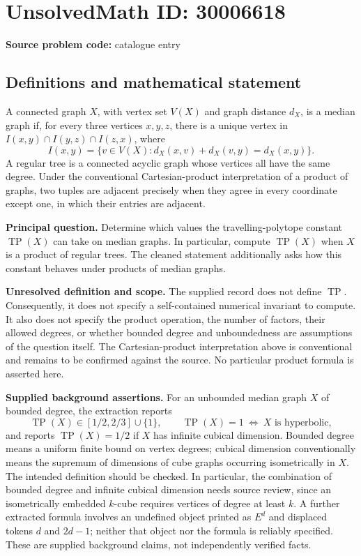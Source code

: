 \documentclass[11pt]{article}
\begin{document}
\section*{UnsolvedMath ID: 30006618}
\textbf{Source problem code:} catalogue entry
\subsection{Definitions and mathematical statement}
A connected graph \(X\), with vertex set \(V(X)\) and graph distance \(d_X\), is a median graph if, for every three vertices \(x,y,z\), there is a unique vertex in \(I(x,y)\cap I(y,z)\cap I(z,x)\), where
\[
I(x,y)=\{v\in V(X):d_X(x,v)+d_X(v,y)=d_X(x,y)\}.
\]
A regular tree is a connected acyclic graph whose vertices all have the same degree. Under the conventional Cartesian-product interpretation of a product of graphs, two tuples are adjacent precisely when they agree in every coordinate except one, in which their entries are adjacent.

\textbf{Principal question.} Determine which values the travelling-polytope constant \(\operatorname{TP}(X)\) can take on median graphs. In particular, compute \(\operatorname{TP}(X)\) when \(X\) is a product of regular trees. The cleaned statement additionally asks how this constant behaves under products of median graphs.

\textbf{Unresolved definition and scope.} The supplied record does not define \(\operatorname{TP}\). Consequently, it does not specify a self-contained numerical invariant to compute. It also does not specify the product operation, the number of factors, their allowed degrees, or whether bounded degree and unboundedness are assumptions of the question itself. The Cartesian-product interpretation above is conventional and remains to be confirmed against the source. No particular product formula is asserted here.

\textbf{Supplied background assertions.} For an unbounded median graph \(X\) of bounded degree, the extraction reports
\[
\operatorname{TP}(X)\in[1/2,2/3]\cup\{1\},\qquad
\operatorname{TP}(X)=1\ \Longleftrightarrow\ X\text{ is hyperbolic},
\]
and reports \(\operatorname{TP}(X)=1/2\) if \(X\) has infinite cubical dimension. Bounded degree means a uniform finite bound on vertex degrees; cubical dimension conventionally means the supremum of dimensions of cube graphs occurring isometrically in \(X\). The intended definition should be checked. In particular, the combination of bounded degree and infinite cubical dimension needs source review, since an isometrically embedded \(k\)-cube requires vertices of degree at least \(k\). A further extracted formula involves an undefined object printed as \(E^d\) and displaced tokens \(d\) and \(2d-1\); neither that object nor the formula is reliably specified. These are supplied background claims, not independently verified facts.
\end{document}
